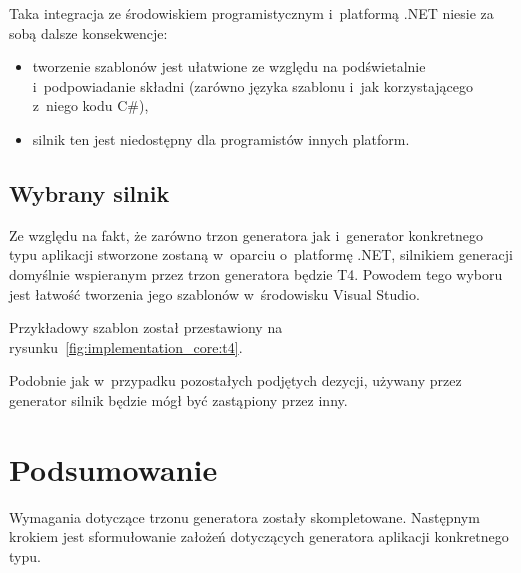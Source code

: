Taka integracja ze środowiskiem programistycznym i~platformą .NET niesie za sobą dalsze konsekwencje:

\begin{itemize}
 \item tworzenie szablonów jest ułatwione ze względu na podświetalnie i~podpowiadanie składni (zarówno języka szablonu i~jak korzystającego z~niego kodu C\#),
 \item silnik ten jest niedostępny dla programistów innych platform.
\end{itemize}


\subsection{Wybrany silnik}

Ze względu na fakt, że zarówno trzon generatora jak i~generator konkretnego typu aplikacji stworzone zostaną w~oparciu o~platformę .NET, silnikiem generacji domyślnie wspieranym przez trzon generatora będzie T4.
Powodem tego wyboru jest łatwość tworzenia jego szablonów w~środowisku Visual Studio.

Przykładowy szablon został przestawiony na rysunku~\ref{fig:implementation_core:t4}.



Podobnie jak w~przypadku pozostałych podjętych dezycji, używany przez generator silnik będzie mógł być zastąpiony przez inny.



\section{Podsumowanie}

Wymagania dotyczące trzonu generatora zostały skompletowane.
Następnym krokiem jest sformułowanie założeń dotyczących generatora aplikacji konkretnego typu.
